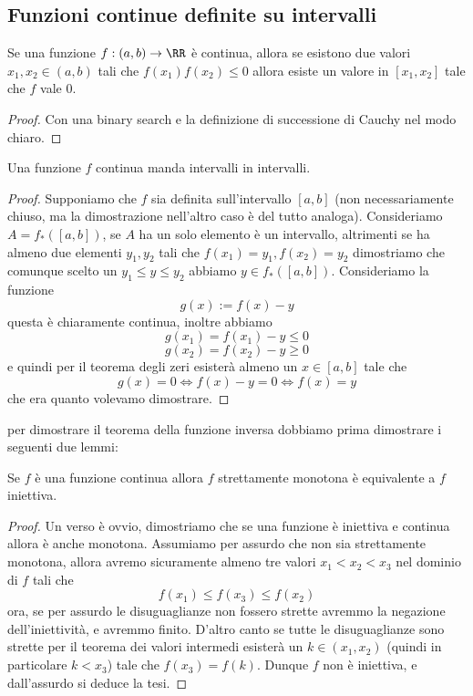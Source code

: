 \documentclass[11pt]{scrartcl}
\begin{document}
	\subsection{Funzioni continue definite su intervalli}
	\begin{theorem}
		Se una funzione $f:(a,b)\to\RR$ è continua, allora se esistono due valori $x_1,x_2\in (a,b)$ tali che $f(x_1)f(x_2)\le 0$ allora esiste un valore in $[x_1,x_2]$ tale che $f$ vale $0$.
	\end{theorem}
	\begin{proof}
		Con una binary search e la definizione di successione di Cauchy nel modo chiaro. 
	\end{proof}
	\begin{theorem}
		Una funzione $f$ continua manda intervalli in intervalli.
	\end{theorem}
	\begin{proof}
		Supponiamo che $f$ sia definita sull'intervallo $[a,b]$ (non necessariamente chiuso, ma la dimostrazione nell'altro caso è del tutto analoga). Consideriamo $A=f_*([a,b])$, se $A$ ha un solo elemento è un intervallo, altrimenti se ha almeno due elementi $y_1,y_2$ tali che $f(x_1)=y_1,f(x_2)=y_2$ dimostriamo che comunque scelto un $y_1 \le y \le y_2$ abbiamo $y\in f_*([a,b])$. Consideriamo la funzione
		$$g(x):=f(x)-y$$
		questa è chiaramente continua, inoltre abbiamo
		$$g(x_1)=f(x_1)-y\le 0$$
		$$g(x_2)=f(x_2)-y\ge 0$$
		e quindi per il teorema degli zeri esisterà almeno un $x\in [a,b]$ tale che
		$$g(x)=0 \iff f(x)-y=0 \iff f(x)=y$$
		che era quanto volevamo dimostrare.  
	\end{proof}
	per dimostrare il teorema della funzione inversa dobbiamo prima dimostrare i seguenti due lemmi:
	\begin{lemma}\label{Iniettiva equivale monotona sulle funzioni continue}
		Se $f$ è una funzione continua allora $f$ strettamente monotona è equivalente a $f$ iniettiva.
	\end{lemma}
	\begin{proof}
		Un verso è ovvio, dimostriamo che se una funzione è iniettiva e continua allora è anche monotona. Assumiamo per assurdo che non sia strettamente monotona, allora avremo sicuramente almeno tre valori $x_1<x_2<x_3$ nel dominio di $f$ tali che 
		$$f(x_1)\le f(x_3)\le f(x_2)$$
		ora, se per assurdo le disuguaglianze non fossero strette avremmo la negazione dell'iniettività, e avremmo finito. D'altro canto se tutte le disuguaglianze sono strette per il teorema dei valori intermedi esisterà un $k\in (x_1,x_2)$ (quindi in particolare $k<x_3$) tale che $f(x_3)=f(k)$. Dunque $f$ non è iniettiva, e dall'assurdo si deduce la tesi.
	\end{proof}
\end{document}
